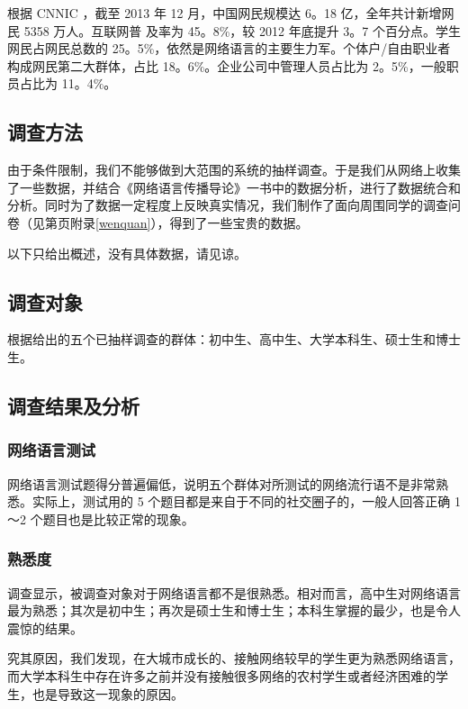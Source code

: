 根据 CNNIC \cite{cnnic}，截至 2013 年 12 月，中国网民规模达 6。18 亿，全年共计新增网民 5358 万人。互联网普
及率为 45。8\%，较 2012 年底提升 3。7 个百分点。学生网民占网民总数的 25。5\%，依然是网络语言的主要生力军。个体户/自由职业者构成网民第二大群体，占比 18。6\%。企业公司中管理人员占比为
2。5\%，一般职员占比为 11。4\%。

\subsection{调查方法}

由于条件限制，我们不能够做到大范围的系统的抽样调查。于是我们从网络上收集了一些数据，并结合《网络语言传播导论》\cite{cao}一书中的数据分析，进行了数据统合和分析。同时为了数据一定程度上反映真实情况，我们制作了面向周围同学的调查问卷（见第\pageref{wenquan}页附录\ref{wenquan}），得到了一些宝贵的数据。

以下只给出概述，没有具体数据，请见谅。

\subsection{调查对象}

根据\cite{cao}给出的五个已抽样调查的群体：初中生、高中生、大学本科生、硕士生和博士生。

\subsection{调查结果及分析}

\subsubsection{网络语言测试}

网络语言测试题得分普遍偏低，说明五个群体对所测试的网络流行语不是非常熟悉。实际上，测试用的 5 个题目都是来自于不同的社交圈子的，一般人回答正确 1～2 个题目也是比较正常的现象。

\subsubsection{熟悉度}

调查显示，被调查对象对于网络语言都不是很熟悉。相对而言，高中生对网络语言最为熟悉；其次是初中生；再次是硕士生和博士生；本科生掌握的最少，也是令人震惊的结果。

究其原因，我们发现，在大城市成长的、接触网络较早的学生更为熟悉网络语言，而大学本科生中存在许多之前并没有接触很多网络的农村学生或者经济困难的学生，也是导致这一现象的原因。


